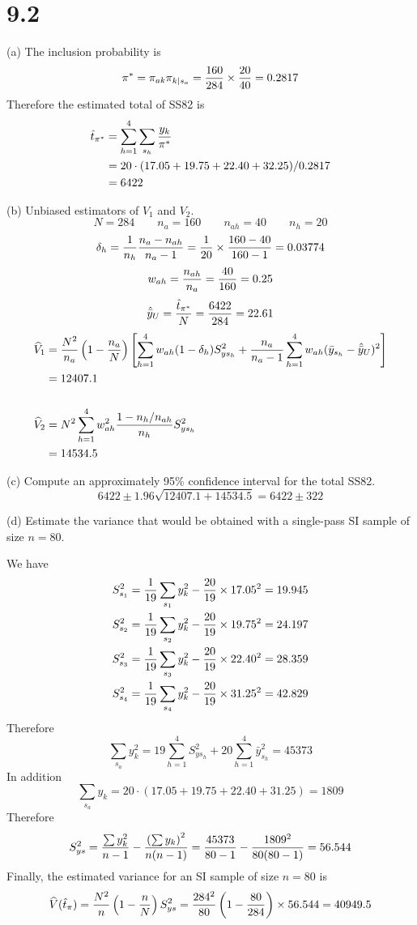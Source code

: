 \documentclass[12pt]{article}
\begin{document}

\section*{9.2}
(a) The inclusion probability is
\[
\pi^*=\pi_{ak}\pi_{k\mid s_a}={160\over284}\times{20\over40}=0.2817
\]
Therefore the estimated total of SS82 is
\begin{align*}
\hat t_{\pi^*}&=\sum_{h=1}^4\sum_{s_h}{y_k\over\pi^*}\\
&=20\cdot(17.05+19.75+22.40+32.25)/0.2817\\
&=6422
\end{align*}

(b) Unbiased estimators of $V_1$ and $V_2$.
\[
N=284
\qquad
n_a=160
\qquad
n_{ah}=40
\qquad
n_h=20
\]
\[
\delta_h={1\over n_h}{n_a-n_{ah}\over n_a-1}
={1\over20}\times{160-40\over 160-1}=0.03774
\]
\[
w_{ah}={n_{ah}\over n_a}={40\over160}=0.25
\]
\[
\hat{\bar y}_U={\hat t_{\pi^*}\over N}={6422\over 284}=22.61
\]
\begin{align*}
\widehat V_1
&=
{N^2\over n_a}\left(1-{n_a\over N}\right)
\left[
\sum_{h=1}^4w_{ah}(1-\delta_h)S_{ys_h}^2
+{n_a\over n_a-1}\sum_{h=1}^4w_{ah}(\bar y_{s_h}-\hat{\bar y}_U)^2
\right]\\
&=
12407.1\\
\\
\widehat V_2
&=N^2\sum_{h=1}^4w_{ah}^2{1-n_h/n_{ah}\over n_h}S_{ys_h}^2\\
&=
14534.5
\end{align*}

(c) Compute an approximately 95\% confidence interval for the total SS82.
\[
6422\pm1.96\sqrt{12407.1+14534.5}=6422\pm322
\]


(d) Estimate the variance that would be obtained with a single-pass SI sample
of size $n=80$.

We have
\begin{align*}
S_{s_1}^2&={1\over19}\sum_{s_1}y_k^2-{20\over19}\times17.05^2=19.945\\
S_{s_2}^2&={1\over19}\sum_{s_2}y_k^2-{20\over19}\times19.75^2=24.197\\
S_{s_3}^2&={1\over19}\sum_{s_3}y_k^2-{20\over19}\times22.40^2=28.359\\
S_{s_4}^2&={1\over19}\sum_{s_4}y_k^2-{20\over19}\times31.25^2=42.829
\end{align*}
Therefore
\[
\sum_{s_a}y_k^2=19\sum_{h=1}^4S_{ys_h}^2+20\sum_{h=1}^4\bar y_{s_h}^2=45373
\]
In addition
\[
\sum_{s_a}y_k=20\cdot(17.05+19.75+22.40+31.25)=1809
\]
Therefore
\[
S_{ys}^2
={\sum y_k^2\over n-1}-{\left(\sum y_k\right)^2\over n(n-1)}
={45373\over80-1}-{1809^2\over80(80-1)}=56.544
\]
Finally, the estimated variance for an SI sample of size $n=80$ is
\[
\widehat V(\hat t_{\pi})
={N^2\over n}\left(1-{n\over N}\right)S_{ys}^2
={284^2\over80}\left(1-{80\over284}\right)\times56.544=40949.5
\]
\end{document}
